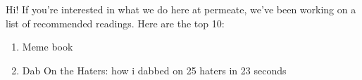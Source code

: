 Hi! If you're interested in what we do here at permeate, we've been working on a list of recommended readings. Here are the top 10:

\begin{enumerate}
	\item Meme book
	\item Dab On the Haters: how i dabbed on 25 haters in 23 seconds
\end{enumerate}